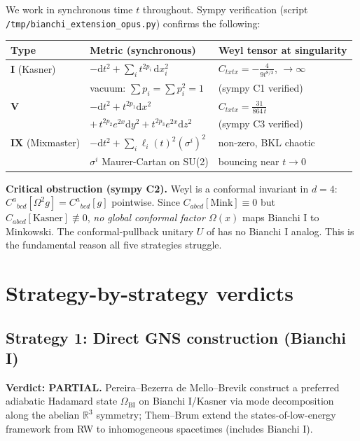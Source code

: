 \documentclass[11pt]{article}
\theoremstyle{definition}
\newcommand{\R}{\mathbb{R}}
\newcommand{\BI}{\mathrm{BI}}
\begin{document}
We work in synchronous time $t$ throughout. Sympy verification (script
\texttt{/tmp/bianchi\_extension\_opus.py}) confirms the following:

\begin{table}[h]
\centering
\begin{tabular}{lll}
\toprule
Type & Metric (synchronous) & Weyl tensor at singularity \\
\midrule
\textbf{I} (Kasner) &
  $-\mathrm dt^2 + \sum_i t^{2 p_i}\,\mathrm dx_i^2$ &
  $C_{txtx} = -\tfrac{4}{9 t^{8/3}}$, $\to\infty$\\
& vacuum: $\sum p_i = \sum p_i^2 = 1$ &
  (sympy C1 verified) \\
\textbf{V} & $-\mathrm dt^2 + t^{2p_1}\mathrm dx^2$ & $C_{txtx}=\tfrac{31}{864\,t}$\\
& $+\,t^{2p_2} e^{2x}\mathrm dy^2 + t^{2p_3}e^{2x}\mathrm dz^2$ & (sympy C3 verified)\\
\textbf{IX} (Mixmaster) &
  $-\mathrm dt^2 + \sum_i \ell_i(t)^2 (\sigma^i)^2$ &
  non-zero, BKL chaotic\\
& $\sigma^i$ Maurer-Cartan on SU(2) &
  bouncing near $t\!\to\!0$ \\
\bottomrule
\end{tabular}
\end{table}

\noindent\textbf{Critical obstruction (sympy C2).}
Weyl is a conformal invariant in $d=4$:
$C^a{}_{bcd}[\Omega^2 g] = C^a{}_{bcd}[g]$ pointwise. Since
$C_{abcd}[\text{Mink}]\equiv 0$ but $C_{abcd}[\text{Kasner}]\not\equiv 0$,
\emph{no global conformal factor $\Omega(x)$} maps Bianchi I to Minkowski.
The conformal-pullback unitary $U$ of \cite[Prop.~3.3]{frw_note} has no
Bianchi I analog. This is the fundamental reason all five strategies
struggle.

\section{Strategy-by-strategy verdicts}\label{sec:strategies}

\subsection{Strategy 1: Direct GNS construction (Bianchi I)}

\textbf{Verdict: PARTIAL.} Pereira--Bezerra de Mello--Brevik
\cite{Pereira2018} construct a preferred adiabatic Hadamard state
$\Omega_\BI$ on Bianchi I/Kasner via mode decomposition along the
abelian $\R^3$ symmetry; Them--Brum \cite{ThemBrum2013} extend the
states-of-low-energy framework from RW to inhomogeneous spacetimes
(includes Bianchi I).
\end{document}
